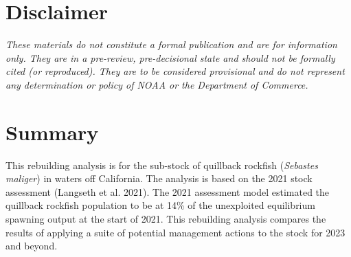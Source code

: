 \documentclass[11pt,
  english,
  letterpaper,
]{article}
\begin{document}
\newcommand{\lt}{\ensuremath <}
\newcommand{\gt}{\ensuremath >}

\pagebreak
{}
\setcounter{page}{1}

\renewcommand{\thetable}{\roman{table}}
\renewcommand{\thefigure}{\roman{figure}}

\setlength\parskip{0.5em plus 0.1em minus 0.2em}


\hypertarget{disclaimer}{%
\section*{Disclaimer}\label{disclaimer}}

\leavevmode\tagmcend\tagstructend


\emph{These materials do not constitute a formal publication and are for information only. They are in a pre-review, pre-decisional state and should not be formally cited (or reproduced). They are to be considered provisional and do not represent any determination or policy of NOAA or the Department of Commerce.}

\leavevmode\tagmcend\tagstructend\par

\pagebreak


\hypertarget{summary}{%
\section*{Summary}\label{summary}}

\leavevmode\tagmcend\tagstructend


This rebuilding analysis is for the sub-stock of quillback rockfish (\emph{Sebastes maliger}) in waters off California. The analysis is based on the 2021 stock assessment {(Langseth et al. 2021)\leavevmode\tagmcend\tagstructend}. The 2021 assessment model estimated the quillback rockfish population to be at 14\% of the unexploited equilibrium spawning output at the start of 2021. This rebuilding analysis compares the results of applying a suite of potential management actions to the stock for 2023 and beyond.
\end{document}
